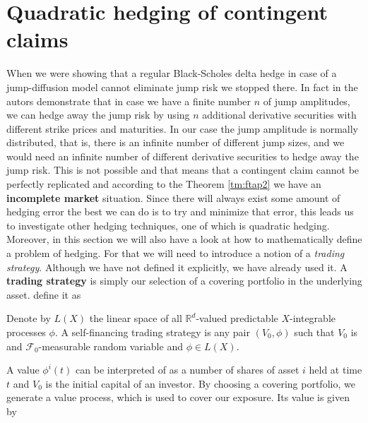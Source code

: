 \documentclass[times, utf8, diplomski]{fer}
\begin{document}
\section{Quadratic hedging of contingent claims}
When we were showing that a regular Black-Scholes delta hedge in case of a jump-diffusion model cannot eliminate jump risk we stopped there. In fact in \cite{chiarella_derivative_2015} the autors demonstrate that in case we have a finite number $n$ of jump amplitudes, we can hedge away the jump risk by using $n$ additional derivative securities with different strike prices and maturities. In our case the jump amplitude is normally distributed, that is, there is an infinite number of different jump sizes, and we would need an infinite number of different derivative securities to hedge away the jump risk. This is not possible and that means that a contingent claim cannot be perfectly replicated and according to the Theorem \ref{tm:ftap2} we have an \textbf{incomplete market} situation. Since there will always exist some amount of hedging error the best we can do is to try and minimize that error, this leads us to investigate other hedging techniques, one of which is quadratic hedging. Moreover, in this section we will also have a look at how to mathematically define a problem of hedging. For that we will need to introduce a notion of a \textit{trading strategy}. Although we have not defined it explicitly, we have already used it. A \textbf{trading strategy} is simply our selection of a covering portfolio in the underlying asset. \cite{bingham_risk-neutral_2004} define it as

\begin{definition}
	Denote by $L(X)$ the linear space of all $\mathbb{R}^d$-valued predictable $X$-integrable processes $\phi$. A self-financing trading strategy is any pair $(V_0, \phi)$ such that $V_0$ is and $\mathcal{F}_0$-measurable random variable and $\phi \in L(X)$.
\end{definition}
\noindent A value $\phi^i(t)$ can be interpreted of as a number of shares of asset $i$ held at time $t$ and $V_0$ is the initial capital of an investor. By choosing a covering portfolio, we generate a value process, which is used to cover our exposure. Its value is given by
\end{document}
